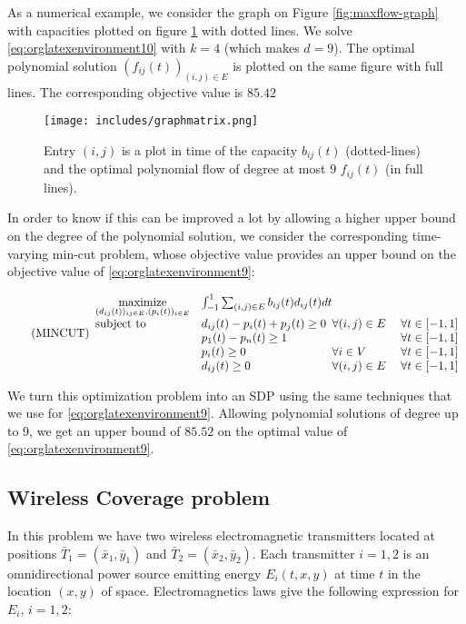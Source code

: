 \documentclass[moor]{informs1}
\begin{document}
As a numerical example, we consider the graph on Figure \ref{fig:maxflow-graph} with capacities plotted on figure \ref{fig:orgparagraph2} with dotted lines. We solve \ref{eq:orglatexenvironment10} with \(k=4\) (which makes \(d = 9\)). The optimal polynomial solution \((f_{ij}(t))_{(i,j) \in E}\) is plotted on the same figure with full lines. The corresponding objective value is \(85.42\)


\begin{figure}[htb]
\centering
\texttt{[image: includes/graphmatrix.png]}
\caption{\label{fig:orgparagraph2}
Entry \((i, j)\) is a plot in time of the capacity \(b_{ij}(t)\) (dotted-lines) and the optimal polynomial flow of degree at most \(9\) \(f_{ij}(t)\) (in full lines).}
\end{figure}



In order to know if this can be improved a lot by allowing a higher upper bound on the degree of the polynomial solution, we consider the corresponding time-varying min-cut problem, whose objective value provides an upper bound on the objective value of \ref{eq:orglatexenvironment9}:

\begin{equation*}
\label{eq:orglatexenvironment11}
\tag{MINCUT}
\begin{array}{ll@{}ll}
\underset{(d_{ij}(t))_{ij \in E}, (p_i(t))_{i \in E}}{\text{maximize}} & \int_{-1}^1  \sum_{(i,j) \in E} b_{ij}(t) d_{ij}(t) dt & \\
\text{subject to}& d_{ij}(t) - p_i(t) + p_j(t)  \geq 0 & \forall (i, j) \in E & \; \forall t \in [-1, 1]\\
&p_1(t) - p_n(t) \geq 1 && \; \forall t \in [-1, 1] \\
&p_i(t) \geq 0 & \forall i \in V & \; \forall t \in [-1, 1]\\
& d_{ij}(t)  \geq 0 & \forall (i, j) \in E & \; \forall t \in [-1, 1]
\end{array}
\end{equation*}

We turn this optimization problem into an SDP using the same techniques that we use for \ref{eq:orglatexenvironment9}. Allowing polynomial solutions of degree up to 9, we get an upper bound of \(85.52\) on the optimal value of \ref{eq:orglatexenvironment9}.
\newpage


\subsection{Wireless Coverage problem}
\label{sec:orgheadline22}
In this problem we have two wireless electromagnetic transmitters located at positions \(\bar T_1 = (\bar x_1, \bar y_1)\) and \(\bar T_2 = (\bar x_2, \bar y_2)\). Each transmitter \(i = 1, 2\) is an omnidirectional power source emitting energy \(E_i(t, x, y)\) at time \(t\) in the location \((x, y)\) of space. Electromagnetics laws give the following expression for \(E_i\), \(i=1,2\):
\end{document}
